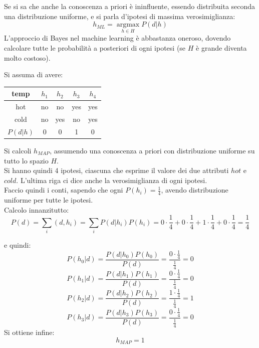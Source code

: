 Se si sa che anche la conoscenza a priori è ininfluente, essendo distribuita
seconda una distribuzione uniforme, e si parla d'ipotesi di massima
verosimiglianza:
\[h_{ML}=\operatorname*{argmax}_{h\in H}P(d|h)\]
L'approccio di Bayes nel machine learning è abbastanza oneroso, dovendo
calcolare tutte le probabilità a posteriori di ogni ipotesi (se $H$ è grande
diventa molto costoso).
\begin{esercizio}
  Si assuma di avere:
  \begin{table}[H]
    \centering
    \begin{tabular}{c||c|c|c|c}
      temp & $h_1$ & $h_2$ & $h_3$ & $h_4$\\
      \hline
      \hline
      hot & no & no & yes & yes\\
      cold & no &yes & no & yes \\
      \hline
      \hline
      $P(d|h)$ & 0 & 0 & 1 &0
    \end{tabular}
  \end{table}
  Si calcoli $h_{MAP}$, assumendo una conoscenza a priori con distribuzione
  uniforme su tutto lo spazio $H$.\\
  Si hanno quindi 4 ipotesi, ciascuna che esprime il valore dei due attributi
  $hot $ e $cold$. L'ultima riga ci dice anche la verosimiglianza di ogni
  ipotesi.\\
  Faccio quindi i conti, sapendo che ogni $P(h_i)=\frac{1}{4}$, avendo
  distribuzione uniforme per tutte le ipotesi.\\
  Calcolo innanzitutto:
  \[P(d)=\sum_i(d, h_i)=\sum_i
    P(d|h_i)P(h_i)=0\cdot\frac{1}{4}+0\cdot\frac{1}{4}+
    1\cdot\frac{1}{4}+0\cdot\frac{1}{4}=\frac{1}{4}\]
  
  e quindi:
  \[P(h_0|d)=\frac{P(d|h_0)P(h_0)}{P(d)}=
    \frac{0\cdot\frac{1}{4}}{\frac{1}{4}}=0\]
  \[P(h_1|d)=\frac{P(d|h_1)P(h_1)}{P(d)}=
    \frac{0\cdot\frac{1}{4}}{\frac{1}{4}}=0\]
  \[P(h_2|d)=\frac{P(d|h_2)P(h_2)}{P(d)}=
    \frac{1\cdot\frac{1}{4}}{\frac{1}{4}}=1\]
  \[P(h_3|d)=\frac{P(d|h_3)P(h_3)}{P(d)}=
    \frac{0\cdot\frac{1}{4}}{\frac{1}{4}}=0\]
  Si ottiene infine:
  \[h_{MAP}=1\]
\end{esercizio}
